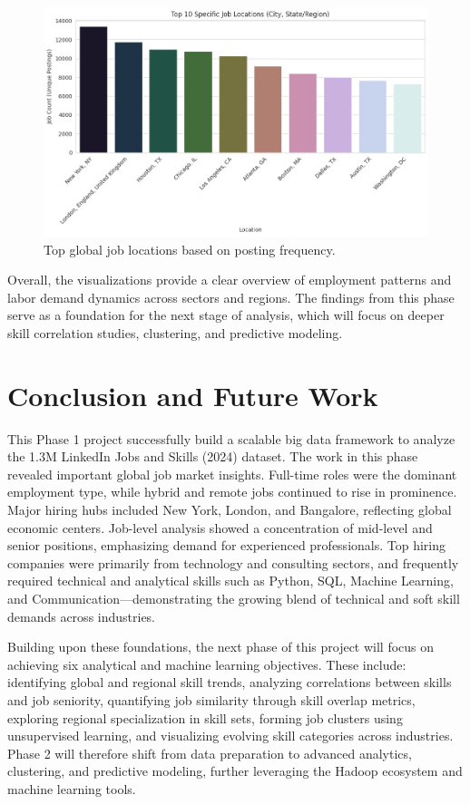 \documentclass[conference]{IEEEtran}
\begin{document}
\begin{figure}[htbp]
    \centering
    \includegraphics[width=\linewidth]{joblocations.jpeg}
\caption{Top global job locations based on posting frequency.}
\label{fig:locations}
\end{figure}


Overall, the visualizations provide a clear overview of employment patterns and labor demand dynamics across sectors and regions. The findings from this phase serve as a foundation for the next stage of analysis, which will focus on deeper skill correlation studies, clustering, and predictive modeling.



\section{\textbf{Conclusion and Future Work}}
This Phase 1 project successfully build a scalable big data framework to analyze the 1.3M LinkedIn Jobs and Skills (2024) dataset. The work in this phase revealed important global job market insights. Full-time roles were the dominant employment type, while hybrid and remote jobs continued to rise in prominence. Major hiring hubs included New York, London, and Bangalore, reflecting global economic centers. Job-level analysis showed a concentration of mid-level and senior positions, emphasizing demand for experienced professionals. Top hiring companies were primarily from technology and consulting sectors, and frequently required technical and analytical skills such as Python, SQL, Machine Learning, and Communication—demonstrating the growing blend of technical and soft skill demands across industries.  

Building upon these foundations, the next phase of this project will focus on achieving six analytical and machine learning objectives. These include: identifying global and regional skill trends, analyzing correlations between skills and job seniority, quantifying job similarity through skill overlap metrics, exploring regional specialization in skill sets, forming job clusters using unsupervised learning, and visualizing evolving skill categories across industries. Phase 2 will therefore shift from data preparation to advanced analytics, clustering, and predictive modeling, further leveraging the Hadoop ecosystem and machine learning tools.  
\end{document}
